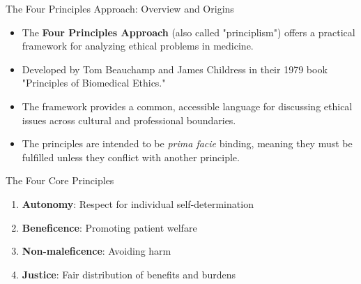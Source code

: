 \documentclass{beamer}
\begin{document}
	\begin{frame}{The Four Principles Approach: Overview and Origins}
		\begin{itemize}
			\item The \textbf{Four Principles Approach} (also called "principlism") offers a practical framework for analyzing ethical problems in medicine.
			\item Developed by Tom Beauchamp and James Childress in their 1979 book "Principles of Biomedical Ethics."
			\item The framework provides a common, accessible language for discussing ethical issues across cultural and professional boundaries.
			\item The principles are intended to be \textit{prima facie} binding, meaning they must be fulfilled unless they conflict with another principle.
		\end{itemize}
		
		\begin{block}{The Four Core Principles}
			\begin{enumerate}
				\item \textbf{Autonomy}: Respect for individual self-determination
				\item \textbf{Beneficence}: Promoting patient welfare
				\item \textbf{Non-maleficence}: Avoiding harm
				\item \textbf{Justice}: Fair distribution of benefits and burdens
			\end{enumerate}
		\end{block}
	\end{frame}
	
	
\end{document}
